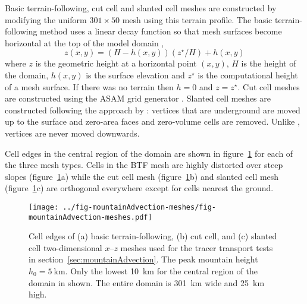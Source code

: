 Basic terrain-following, cut cell and slanted cell meshes are constructed by modifying the uniform $301 \times 50$ mesh using this terrain profile.
The basic terrain-following method uses a linear decay function so that mesh surfaces become horizontal at the top of the model domain \citep{galchen-somerville1975},
\begin{equation}
	z(x,y) = \left( H - h(x,y) \right) \left( z^\star / H \right) + h(x,y) \label{eqn:btf}
\end{equation}
where $z$ is the geometric height at a horizontal point $(x, y)$, $H$ is the height of the domain, $h(x,y)$ is the surface elevation and $z^\star$ is the computational height of a mesh surface.  If there was no terrain then $h = 0$ and $z = z^\star$.
Cut cell meshes are constructed using the ASAM grid generator \citep{jaehn2015} .  Slanted cell meshes are constructed following the approach by \citep{shaw-weller2016}: vertices that are underground are moved up to the surface and zero-area faces and zero-volume cells are removed.  Unlike \citep{shaw-weller2016}, vertices are never moved downwards.  

Cell edges in the central region of the domain are shown in figure~\ref{fig:mountainAdvection-meshes} for each of the three mesh types.
Cells in the BTF mesh are highly distorted over steep slopes (figure~\ref{fig:mountainAdvection-meshes}a) while the cut cell mesh (figure~\ref{fig:mountainAdvection-meshes}b) and slanted cell mesh (figure~\ref{fig:mountainAdvection-meshes}c) are orthogonal everywhere except for cells nearest the ground.

\begin{figure}
	\centering
	\texttt{[image: ../fig-mountainAdvection-meshes/fig-mountainAdvection-meshes.pdf]}
	\caption{Cell edges of (a) basic terrain-following, (b) cut cell, and (c) slanted cell two-dimensional $x$--$z$ meshes used for the tracer transport tests in section~\ref{sec:mountainAdvection}.  The peak mountain height $h_0 = \SI{5}{\kilo\meter}$.  Only the lowest \SI{10}{\kilo\meter} for the central region of the domain in shown.  The entire domain is \SI{301}{\kilo\meter} wide and \SI{25}{\kilo\meter} high.}
	\label{fig:mountainAdvection-meshes}
\end{figure}

